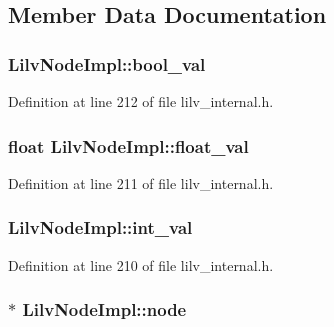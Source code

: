 \subsection{Member Data Documentation}
\subsubsection[{\texorpdfstring{bool\+\_\+val}{bool_val}}]{ Lilv\+Node\+Impl\+::bool\+\_\+val}\hypertarget{struct_lilv_node_impl_ae0425c0f22aa7235a5f5ada6d82638be}{}\label{struct_lilv_node_impl_ae0425c0f22aa7235a5f5ada6d82638be}


Definition at line 212 of file lilv\+\_\+internal.\+h.

\subsubsection[{\texorpdfstring{float\+\_\+val}{float_val}}]{\setlength{\rightskip}{0pt plus 5cm}float Lilv\+Node\+Impl\+::float\+\_\+val}\hypertarget{struct_lilv_node_impl_a73d438924503dfcf0935be5c925a0172}{}\label{struct_lilv_node_impl_a73d438924503dfcf0935be5c925a0172}


Definition at line 211 of file lilv\+\_\+internal.\+h.

\subsubsection[{\texorpdfstring{int\+\_\+val}{int_val}}]{ Lilv\+Node\+Impl\+::int\+\_\+val}\hypertarget{struct_lilv_node_impl_aab7e8d7b76fd5bd1cf7c99c3262ff959}{}\label{struct_lilv_node_impl_aab7e8d7b76fd5bd1cf7c99c3262ff959}


Definition at line 210 of file lilv\+\_\+internal.\+h.

\subsubsection[{\texorpdfstring{node}{node}}]{$\ast$ Lilv\+Node\+Impl\+::node}\hypertarget{struct_lilv_node_impl_a10b31ad2e47d09fcb23089c5706e84c0}{}\label{struct_lilv_node_impl_a10b31ad2e47d09fcb23089c5706e84c0}


